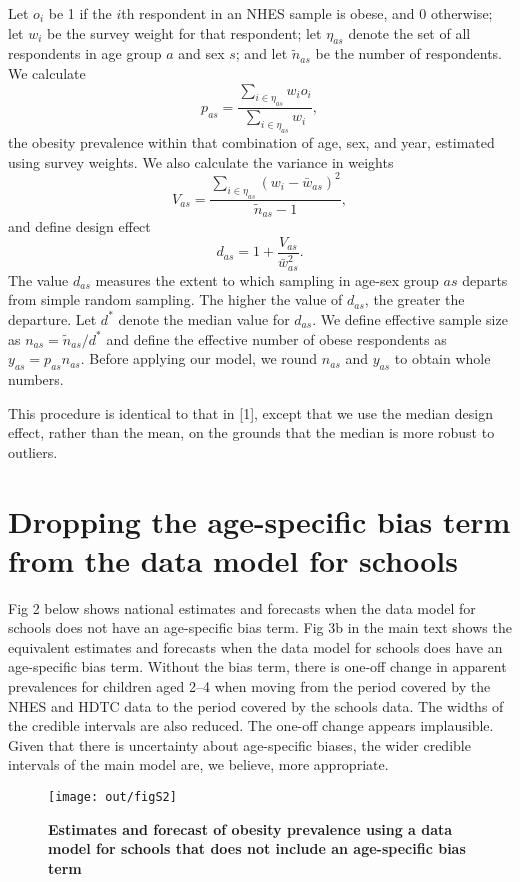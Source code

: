 \documentclass[10pt,letterpaper]{article}
\begin{document}
Let \(o_{i}\) be 1 if the \(i\)th respondent in an NHES sample is obese,
and 0 otherwise; let \(w_{i}\) be the survey weight for that respondent;
let \(\eta_{as}\) denote the set of all respondents in age group \(a\)
and sex \(s\); and let \(\tilde{n}_{as}\) be the number of respondents.
We calculate \[
  p_{as} = \frac{\sum_{i \in \eta_{as}} w_i o_i}{\sum_{i \in \eta_{as}} w_i},
\] the obesity prevalence within that combination of age, sex, and year,
estimated using survey weights. We also calculate the variance in
weights \[
  V_{as} = \frac{\sum_{i \in \eta_{as}}(w_i - \bar{w}_{as})^2}{\tilde{n}_{as}-1},
\] and define design effect \[
d_{as} = 1 + \frac{V_{as}}{\bar{w}_{as}^2}.
\] The value \(d_{as}\) measures the extent to which sampling in age-sex
group \(as\) departs from simple random sampling. The higher the value
of \(d_{as}\), the greater the departure. Let \(d^*\) denote the median
value for \(d_{as}\). We define effective sample size as
\(n_{as} = \tilde{n}_{as}/d^*\) and define the effective number of obese
respondents as \(y_{as} = p_{as} n_{as}\). Before applying our model, we
round \(n_{as}\) and \(y_{as}\) to obtain whole numbers.

This procedure is identical to that in {[}1{]}, except that we use the
median design effect, rather than the mean, on the grounds that the
median is more robust to outliers.

\hypertarget{dropping-the-age-specific-bias-term-from-the-data-model-for-schools}{%
\section{Dropping the age-specific bias term from the data model for
schools}\label{dropping-the-age-specific-bias-term-from-the-data-model-for-schools}}

Fig 2 below shows national estimates and forecasts when the data model
for schools does not have an age-specific bias term. Fig 3b in the main
text shows the equivalent estimates and forecasts when the data model
for schools does have an age-specific bias term. Without the bias term,
there is one-off change in apparent prevalences for children aged 2--4
when moving from the period covered by the NHES and HDTC data to the
period covered by the schools data. The widths of the credible intervals
are also reduced. The one-off change appears implausible. Given that
there is uncertainty about age-specific biases, the wider credible
intervals of the main model are, we believe, more appropriate.

\begin{figure}[h]
\texttt{[image: out/figS2]}
\caption{\textbf{Estimates and forecast of obesity prevalence using a data model for schools that does not include an age-specific bias term}}
\end{figure}
\end{document}
